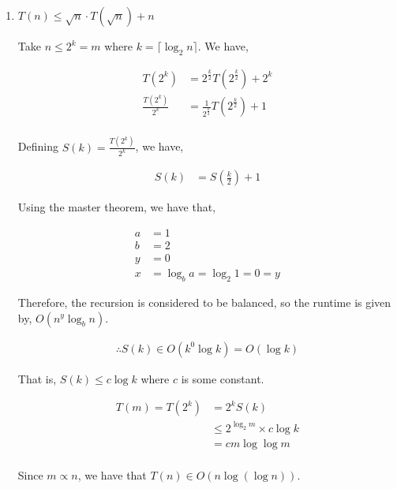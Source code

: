 \begin{enumerate}
    \item $T(n) \le \sqrt{n} \cdot T(\sqrt{n}) + n$

          Take $n \le 2^k = m$ where $k = \lceil \log_2{n} \rceil$. We have,

          \begin{align*}
              T\left(2^k\right)             & = 2^\frac{k}{2} T\left(2^\frac{k}{2}\right) + 2^k         \\
              \frac{T\left(2^k\right)}{2^k} & = \frac{1}{2^\frac{k}{2}} T\left(2^\frac{k}{2}\right) + 1 \\
          \end{align*}

          Defining $S\left(k\right) = \frac{T\left(2^k\right)}{2^k}$, we have,

          \begin{align*}
              S\left(k\right) & = S\left(\frac{k}{2}\right) + 1
          \end{align*}

          Using the master theorem, we have that,

          \begin{align*}
              a & = 1                             \\
              b & = 2                             \\
              y & = 0                             \\
              x & = \log_b{a} = \log_2{1} = 0 = y
          \end{align*}

          Therefore, the recursion is considered to be balanced, so the runtime is given by, $O\left( n^y \log_b{n} \right)$.

          \begin{align*}
              \therefore S(k) \in O\left( k^0 \log{k} \right) =  O\left( \log{k} \right)
          \end{align*}

          That is, $S(k) \le c \log{k}$ where $c$ is some constant.

          \begin{align*}
              T\left(m\right) = T\left(2^k\right) & = 2^k S\left(k\right)              \\
                                                  & \le 2^{\log_2{m}} \times c \log{k} \\
                                                  & = c m \log{\log{m}}                \\
          \end{align*}

          Since $m \propto n$, we have that $T\left(n\right) \in O\left(n \log{\left(\log{n}\right)}\right)$.

\end{enumerate}